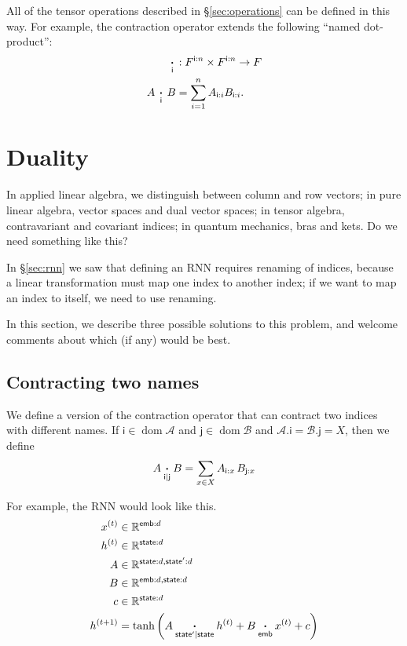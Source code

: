 \documentclass{article}
\newcommand{\name}[1]{\mathsf{#1}}
\newcommand{\ndot}[1]{\mathbin{\mathop{\thinspace\boldsymbol\cdot\thinspace}\displaylimits_{\name{#1}}}}
\newcommand{\nndot}[2]{\mathbin{\mathop{\thinspace\boldsymbol\cdot\thinspace}\displaylimits_{\name{#1}|\name{#2}}}}
\DeclareMathOperator{\tupledom}{dom}
\newcommand{\tupleproj}[2]{#1.#2}
\begin{document}
All of the tensor operations described in \S\ref{sec:operations} can be defined in this way. For example, the contraction operator extends the following ``named dot-product'':
\begin{align*}
\ndot{i} &: F^{\name{i}:n} \times F^{\name{i}:n} \rightarrow F \\
A \ndot{i} B &= \sum_{i=1}^n A_{\name{i}:i} B_{\name{i}:i}.
\end{align*}

\section{Duality}
\label{sec:duality}

In applied linear algebra, we distinguish between column and row vectors; in pure linear algebra, vector spaces and dual vector spaces; in tensor algebra, contravariant and covariant indices; in quantum mechanics, bras and kets. Do we need something like this?

In \S\ref{sec:rnn} we saw that defining an RNN requires renaming of indices, because a linear transformation must map one index to another index; if we want to map an index to itself, we need to use renaming.

In this section, we describe three possible solutions to this problem, and welcome comments about which (if any) would be best.

\subsection{Contracting two names}

We define a version of the contraction operator that can contract two indices with different names. If $\name{i} \in \tupledom \mathcal{A}$ and $\name{j} \in \tupledom \mathcal{B}$ and $\tupleproj{\mathcal{A}}{\name{i}} = \tupleproj{\mathcal{B}}{\name{j}} = X$, then we define
\begin{equation*}
A \nndot{i}{j} B = \sum_{x \in X} A_{\name{i}: x} \, B_{\name{j}: x}
\end{equation*}

For example, the RNN would look like this.
\begin{align*}
x^{(t)} &\in \mathbb{R}^{\name{emb}: d} \\
h^{(t)} &\in \mathbb{R}^{\name{state}: d} \\
A &\in \mathbb{R}^{\name{state}: d, \name{state'}: d} \\
B &\in \mathbb{R}^{\name{emb}: d, \name{state}: d} \\
c &\in \mathbb{R}^{\name{state}: d} \\
h^{(t+1)} &= \tanh\left( A \nndot{state'}{state} h^{(t)} + B \ndot{emb} x^{(t)} + c \right)
\end{align*}
\end{document}
